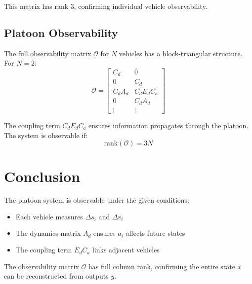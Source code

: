 \documentclass{article}
\begin{document}
This matrix has rank 3, confirming individual vehicle observability.

\subsection{Platoon Observability}
The full observability matrix $\mathcal{O}$ for $N$ vehicles has a block-triangular structure. For $N=2$:
\[
\mathcal{O} = \begin{bmatrix}
C_d & 0 \\
0 & C_d \\
C_d A_d & C_d E_d C_a \\
0 & C_d A_d \\
\vdots & \vdots
\end{bmatrix}
\]

The coupling term $C_d E_d C_a$ ensures information propagates through the platoon. The system is observable if:
\[
\text{rank}(\mathcal{O}) = 3N
\]

\section{Conclusion}
The platoon system is observable under the given conditions:
\begin{itemize}
\item Each vehicle measures $\Delta s_i$ and $\Delta v_i$
\item The dynamics matrix $A_d$ ensures $a_i$ affects future states
\item The coupling term $E_d C_a$ links adjacent vehicles
\end{itemize}

The observability matrix $\mathcal{O}$ has full column rank, confirming the entire state $x$ can be reconstructed from outputs $y$.
\end{document}
